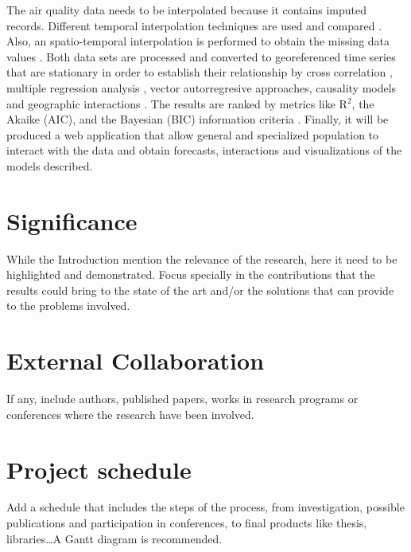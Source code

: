 \documentclass[
  11pt,
  a4paper,
  oneside
]{article}
\begin{document}
The air quality data needs to be interpolated because it contains imputed records. Different temporal interpolation techniques are used and compared \citep{Friedman1962}. Also, an spatio-temporal interpolation is performed to obtain the missing data values \citep{LiEA2002}. Both data sets are processed and converted to georeferenced time series \citep{Wei2019} that are stationary \citep{Hyndman2018} in order to establish their relationship by cross correlation \citep{derrickEA2004}, multiple regression analysis \citep{Brockwell2002}, vector autorregresive approaches, causality models \citep{popescuEA2013} and geographic interactions \citep{ComberEA2019}. The results are ranked by metrics like R$^2$, the Akaike (AIC), and the Bayesian (BIC) information criteria \citep{Albert2007}. Finally, it will be produced a web application that allow general and specialized population to interact with the data and obtain forecasts, interactions and visualizations of the models described.

\section{Significance}
While the Introduction mention the relevance of the research, here it need to be highlighted and demonstrated. Focus specially in the contributions that the results could bring to the state of the art and/or the solutions that can provide to the problems involved.

\section{External Collaboration}

If any, include authors, published papers, works in research programs or conferences where the research have been involved.

\section{Project schedule}
Add a schedule that includes the steps of the process, from investigation, possible publications and participation in conferences, to final products like thesis, libraries\ldots A Gantt diagram is recommended.



\end{document}
